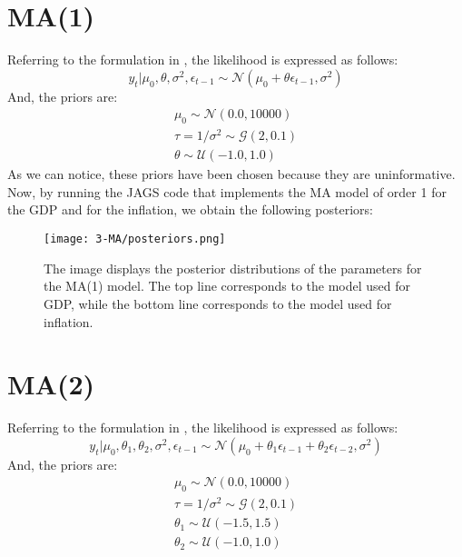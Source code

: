 \section*{MA(1)}
\label{MA(1)}
Referring to the formulation in , the likelihood is expressed as follows:
$$
y_t | \mu_0, \theta, \sigma^2, \epsilon_{t-1} \sim \mathcal{N}(\mu_0 + \theta \epsilon_{t-1},\sigma^2)
$$
And, the priors are:
\begin{equation}
    \begin{split}
        \mu_0 \sim \mathcal{N}(0.0, 10000) \\
        \tau = 1 / \sigma^2 \sim \mathcal{G}(2, 0.1) \\
        \theta \sim \mathcal{U}(-1.0, 1.0)
    \end{split}
\end{equation}
As we can notice, these priors have been chosen because they are uninformative. \\
Now, by running the JAGS code that implements the MA model of order 1 for the GDP and for the inflation, we obtain the following posteriors: \\
\begin{figure}[h]
    \centering
    \texttt{[image: 3-MA/posteriors.png]}
    \caption{The image displays the posterior distributions of the parameters for the MA(1) model. The top line corresponds to the model used for GDP, while the bottom line corresponds to the model used for inflation.}
    \label{MA_posteriors}
\end{figure}

\section*{MA(2)}
\label{MA(2)}
Referring to the formulation in , the likelihood is expressed as follows:
$$
y_t | \mu_0, \theta_1, \theta_2, \sigma^2, \epsilon_{t-1} \sim \mathcal{N}(\mu_0 + \theta_1 \epsilon_{t-1} + \theta_2 \epsilon_{t-2},\sigma^2)
$$
And, the priors are:
\begin{equation}
    \begin{split}
        \mu_0 \sim \mathcal{N}(0.0, 10000) \\
        \tau = 1 / \sigma^2 \sim \mathcal{G}(2, 0.1) \\
        \theta_1 \sim \mathcal{U}(-1.5, 1.5) \\
        \theta_2 \sim \mathcal{U}(-1.0, 1.0)
    \end{split}
\end{equation}